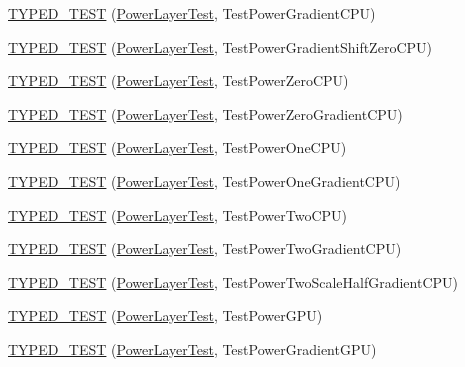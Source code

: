 \begin{DoxyCompactItemize}
\item 
\hyperlink{namespacecaffe_a520202ff2b6b033e21d3fcf1008d124f}{T\+Y\+P\+E\+D\+\_\+\+T\+E\+S\+T} (\hyperlink{classcaffe_1_1_power_layer_test}{Power\+Layer\+Test}, Test\+Power\+Gradient\+C\+P\+U)
\item 
\hyperlink{namespacecaffe_af90f66c87fc90d734bb4fe230bcdc8a2}{T\+Y\+P\+E\+D\+\_\+\+T\+E\+S\+T} (\hyperlink{classcaffe_1_1_power_layer_test}{Power\+Layer\+Test}, Test\+Power\+Gradient\+Shift\+Zero\+C\+P\+U)
\item 
\hyperlink{namespacecaffe_a6cb8586959b3cb6a931160f5f028728c}{T\+Y\+P\+E\+D\+\_\+\+T\+E\+S\+T} (\hyperlink{classcaffe_1_1_power_layer_test}{Power\+Layer\+Test}, Test\+Power\+Zero\+C\+P\+U)
\item 
\hyperlink{namespacecaffe_a0776849ebf9c4f259fc70b903eee923e}{T\+Y\+P\+E\+D\+\_\+\+T\+E\+S\+T} (\hyperlink{classcaffe_1_1_power_layer_test}{Power\+Layer\+Test}, Test\+Power\+Zero\+Gradient\+C\+P\+U)
\item 
\hyperlink{namespacecaffe_aca280232dc92505faf70d9bd320afd37}{T\+Y\+P\+E\+D\+\_\+\+T\+E\+S\+T} (\hyperlink{classcaffe_1_1_power_layer_test}{Power\+Layer\+Test}, Test\+Power\+One\+C\+P\+U)
\item 
\hyperlink{namespacecaffe_abf9a8c71d8419ca1bbc9c74727ec3c31}{T\+Y\+P\+E\+D\+\_\+\+T\+E\+S\+T} (\hyperlink{classcaffe_1_1_power_layer_test}{Power\+Layer\+Test}, Test\+Power\+One\+Gradient\+C\+P\+U)
\item 
\hyperlink{namespacecaffe_a75a1a697ed09f1e8a266cbbc1cf533ed}{T\+Y\+P\+E\+D\+\_\+\+T\+E\+S\+T} (\hyperlink{classcaffe_1_1_power_layer_test}{Power\+Layer\+Test}, Test\+Power\+Two\+C\+P\+U)
\item 
\hyperlink{namespacecaffe_a7e87032e6915da8583a7f1eac496b6d0}{T\+Y\+P\+E\+D\+\_\+\+T\+E\+S\+T} (\hyperlink{classcaffe_1_1_power_layer_test}{Power\+Layer\+Test}, Test\+Power\+Two\+Gradient\+C\+P\+U)
\item 
\hyperlink{namespacecaffe_a4579025745e0446cf692bf62fba98cde}{T\+Y\+P\+E\+D\+\_\+\+T\+E\+S\+T} (\hyperlink{classcaffe_1_1_power_layer_test}{Power\+Layer\+Test}, Test\+Power\+Two\+Scale\+Half\+Gradient\+C\+P\+U)
\item 
\hyperlink{namespacecaffe_a74406e46487a7664dad2823c6ef30cc2}{T\+Y\+P\+E\+D\+\_\+\+T\+E\+S\+T} (\hyperlink{classcaffe_1_1_power_layer_test}{Power\+Layer\+Test}, Test\+Power\+G\+P\+U)
\item 
\hyperlink{namespacecaffe_a549108923280b8786b05ed8e5d08daf7}{T\+Y\+P\+E\+D\+\_\+\+T\+E\+S\+T} (\hyperlink{classcaffe_1_1_power_layer_test}{Power\+Layer\+Test}, Test\+Power\+Gradient\+G\+P\+U)

\end{DoxyCompactItemize}
